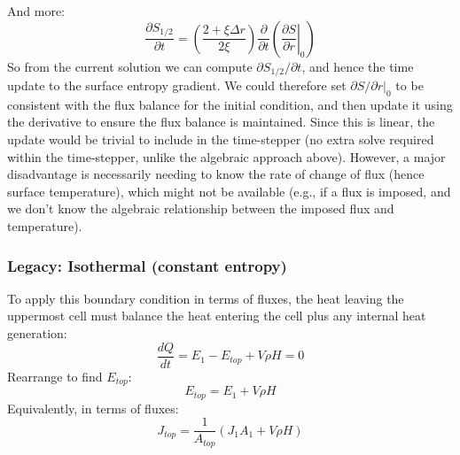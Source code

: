 And more:
\begin{equation}
\frac{\partial S_{1/2}}{\partial t} = \left(\frac{2 + \xi \Delta r}{2 \xi} \right) \frac{\partial}{\partial t} \left( \left. \frac{\partial S}{\partial r}\right|_0 \right)
\label{eq:surfbc}
\end{equation}
So from the current solution we can compute $\partial S_{1/2}/\partial t$, and hence the time update to the surface entropy gradient.  We could therefore set $\partial S/\partial r|_0$ to be consistent with the flux balance for the initial condition, and then update it using the derivative to ensure the flux balance is maintained.  Since this is linear, the update would be trivial to include in the time-stepper (no extra solve required within the time-stepper, unlike the algebraic approach above).  However, a major disadvantage is necessarily needing to know the rate of change of flux (hence surface temperature), which might not be available (e.g., if a flux is imposed, and we don't know the algebraic relationship between the imposed flux and temperature).

\subsubsection{Legacy: Isothermal (constant entropy)}
To apply this boundary condition in terms of fluxes, the heat leaving the uppermost cell must balance the heat entering the cell plus any internal heat generation:
\begin{equation}
\frac{dQ}{dt} = E_{1} - E_{top} + V \rho H = 0
\end{equation}
Rearrange to find $E_{top}$:
\begin{equation}
E_{top} = E_1 + V \rho H
\end{equation}
Equivalently, in terms of fluxes:
\begin{equation}
J_{top} = \frac{1}{A_{top}} \left( J_1A_1 + V \rho H \right)
\end{equation}
